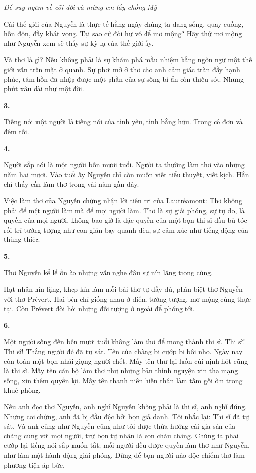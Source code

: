 \documentclass[../main.tex]{subfiles}
\begin{document}
\begin{multicols}{2}
\begin{blockquote}
\textit{Để suy ngẫm về cõi đời} 
\textit{và mừng em lấy chồng Mỹ} 

\end{blockquote}
 
Cái thế giới của Nguyễn là thực tế hằng ngày chúng ta đang sống, quay cuồng, hỗn độn, đầy khát vọng. Tại sao cứ đòi hư vô để mơ mộng? Hãy thử mơ mộng như Nguyễn xem sẽ thấy sự kỳ lạ của thế giới ấy. 
 
Và thơ là gì? Nếu không phải là sự khám phá mầu nhiệm bằng ngôn ngữ một thế giới vẫn trốn mặt ở quanh. Sự phơi mở ở thơ cho anh cảm giác tràn đầy hạnh phúc, tâm hồn đã nhập được một phần của sự sống bí ẩn còn thiếu sót. Những phút xâu dài như một đời. 
 
 
\textbf{3.} 
 
Tiếng nói một người là tiếng nói của tình yêu, tình bằng hữu. Trong cô đơn và đêm tối.        
        
 
\textbf{4.} 
 
Người sắp nói là một người bốn mươi tuổi. Người ta thường làm thơ vào những năm hai mươi. Vào tuổi ấy Nguyễn chỉ còn muốn viết tiểu thuyết, viết kịch. Hắn chỉ thấy cần làm thơ trong vài năm gần đây. 
 
Việc làm thơ của Nguyễn chứng nhận lời tiên tri của Lautréamont: Thơ không phải để một người làm mà để mọi người làm. Thơ là sự giải phóng, sự tự do, là quyền của mọi người, không bao giờ là đặc quyền của một bọn thi sĩ đầu bù tóc rối trí tưởng tượng như con gián bay quanh đèn, sự cảm xúc như tiếng động của thùng thiếc. 
 
 
\textbf{5.} 
 
Thơ Nguyễn kể lể ồn ào nhưng vẫn nghe đâu sự nín lặng trong cùng. 
 
Hạt nhân nín lặng, khép kín làm mỗi bài thơ tự đầy đủ, phân biệt thơ Nguyễn với thơ Prévert. Hai bên chỉ giống nhau ở điểm tưởng tượng, mơ mộng cùng thực tại. Còn Prévert đòi hỏi những đối tượng ở ngoài để phóng tới. 
 
 
\textbf{6.} 
 
Một người sống đến bốn mươi tuổi không làm thơ để mong thành thi sĩ. Thi sĩ! Thi sĩ! Thằng người đó đã tự sát. Tên của chàng bị cướp bị bôi nhọ. Ngày nay còn toàn một bọn nhái giọng người chết. Mấy tên thư lại luồn cúi nịnh hót cũng là thi sĩ. Mấy tên cán bộ làm thơ như những bản thỉnh nguyện xin tha mạng sống, xin thêm quyền lợi. Mấy tên thanh niên hiến thân làm tấm gối ôm trong khuê phòng. 
 
Nếu anh đọc thơ Nguyễn, anh nghĩ Nguyễn không phải là thi sĩ, anh nghĩ đúng. Nhưng coi chừng, anh đã bị đầu độc bởi bọn giả danh. Tôi nhắc lại: Thi sĩ đã tự sát. Và anh cũng như Nguyễn cũng như tôi được thừa hưởng cái gia sản của chàng cùng với mọi người, trừ bọn tự nhận là con cháu chàng. Chúng ta phải cướp lại tiếng nói sắp muốn tắt; mỗi người đều được quyền làm thơ như Nguyễn, như làm một hành động giải phóng. Đừng để bọn người nào độc chiếm thơ làm phương tiện áp bức. 
 

\end{multicols}
\end{document}
